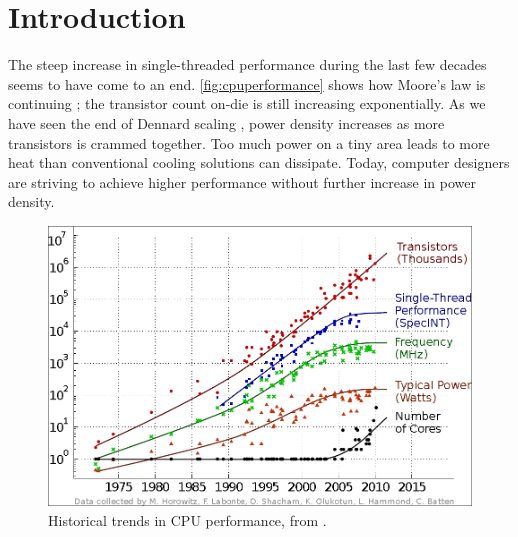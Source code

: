 \chapter{Introduction}

The steep increase in single-threaded performance during the last few decades
seems to have come to an end. \autoref{fig:cpuperformance} shows how Moore's law
is continuing \cite{moore1965cramming, tanenbaum1984structured}; the transistor
count on-die is still increasing exponentially. As we have seen the end of
Dennard scaling \cite{dennard1974design,esmaeilzadeh2011dark}, power density
increases as more transistors is crammed together. Too much power on a tiny area
leads to more heat than conventional cooling solutions can dissipate. Today,
computer designers are striving to achieve higher performance without further
increase in power density.


\begin{figure}[bht]
\includegraphics[width=\textwidth]{figs/cpu-performance.png}
\caption{Historical trends in CPU performance, from \cite{salishan2011}.}
    \label{fig:cpuperformance}
\end{figure}











%


